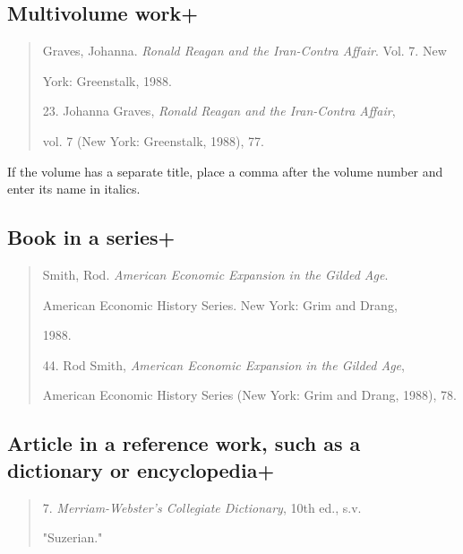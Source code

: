 \subsection{Multivolume work+}
\begin{quote}

Graves, Johanna. \emph{Ronald Reagan and the Iran-Contra Affair}. Vol. 7. New 

\hspace{.4in}York: Greenstalk, 1988.

\medskip

\hspace{.4in}23. Johanna Graves, \emph{Ronald Reagan and the Iran-Contra Affair}, 

vol. 7 (New York: Greenstalk, 1988), 77.
\end{quote}

 If the volume has a separate title, place a comma after the volume number and enter its name in italics.

\subsection{Book in a series+}

\begin{quote}

Smith, Rod. \emph{American Economic Expansion in the Gilded Age}.

\hspace{.4in} American Economic History Series. New York: Grim and Drang, 

\hspace{.4in}1988.

\medskip

\hspace{.4in}44. Rod Smith, \emph{American Economic Expansion in the Gilded Age},

American Economic History Series (New York: Grim and Drang, 1988), 78.

\end{quote}

\subsection{Article in a reference work, such as a dictionary or encyclopedia+}
\begin{quote}

\hspace{.4in}7. \emph{Merriam-Webster's Collegiate Dictionary}, 10th ed., s.v. 

"Suzerian." 

\end{quote}

